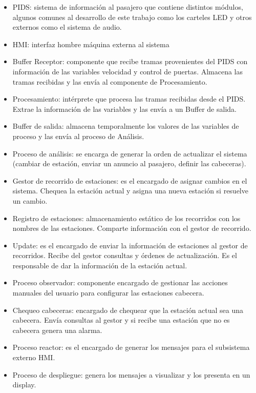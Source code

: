 \documentclass[
11pt, %
]{charter}
\begin{document}
\begin{itemize}
\item PIDS: sistema de información al pasajero que contiene distintos módulos, algunos comunes al desarrollo de este trabajo como los carteles LED y otros externos como el sistema de audio.
\item HMI: interfaz hombre máquina externa al sistema
\item Buffer Receptor: componente que recibe tramas provenientes del PIDS con información
de las variables velocidad y control de puertas. Almacena las tramas recibidas y las
envía al componente de Procesamiento.
\item Procesamiento: intérprete que procesa las tramas recibidas desde el PIDS. Extrae la
información de las variables y las envía a un Buffer de salida.
\item Buffer de salida: almacena temporalmente los valores de las variables de proceso y las
envía al proceso de Análisis.
\item Proceso de análisis: se encarga de generar la orden de actualizar el sistema (cambiar
de estación, enviar un anuncio al pasajero, definir las cabeceras).
\item Gestor de recorrido de estaciones: es el encargado de asignar cambios en el sistema.
Chequea la estación actual y asigna una nueva estación si resuelve un cambio.
\item Registro de estaciones: almacenamiento estático de los recorridos con los nombres de
las estaciones. Comparte información con el gestor de recorrido.
\item Update: es el encargado de enviar la información de estaciones al gestor de recorridos.
Recibe del gestor consultas y órdenes de actualización. Es el responsable de dar la
información de la estación actual.
\item Proceso observador: componente encargado de gestionar las acciones manuales del
usuario para configurar las estaciones cabecera.
\item Chequeo cabeceras: encargado de chequear que la estación actual sea una cabecera.
Envía consultas al gestor y si recibe una estación que no es cabecera genera una
alarma.
\item Proceso reactor: es el encargado de generar los mensajes para el subsistema externo
HMI.
\item Proceso de despliegue: genera los mensajes a visualizar y los presenta en un display.
\end{itemize}
\end{document}
